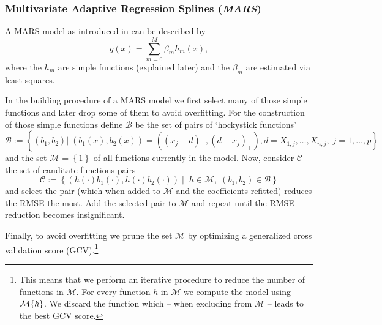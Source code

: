 \subsubsection*{Multivariate Adaptive Regression Splines (\textit{MARS})}{
    A MARS model as introduced in \cite{friedmanMultivariateAdaptiveRegression1991} can be described by 
    \begin{equation}
        \label{eq:mars}
        g(x) = \sum_{m=0}^M \beta_m h_m(x),
    \end{equation}
    where the $h_m$ are simple functions (explained later) and the $\beta_m$ are estimated via least squares. 
    
    In the building procedure of a MARS model we first select many of those simple functions and later drop some of them to avoid overfitting. For the construction of those simple functions define $\mathcal{B}$ be the set of pairs of `hockystick functions'
    \begin{equation}
        \label{eq:mars_basis_fun}
        \mathcal{B}:=\left\{
            \left(b_1,b_2\right) 
            | \;
            \left(b_1(x),b_2(x)\right) = \left(\left(x_{j}-d\right)_+,\left(d-x_{j}\right)_+\right),
            d =X_{1, j},  \ldots, X_{n, j},\;
            j=1, \ldots, p
        \right\}
    \end{equation}
    and the set $\mathcal{M}=\left\{1\right\}$ of all functions currently in the model. Now, consider $\mathcal{C}$ the set of canditate functions-pairs 
    \begin{equation}
        \label{eq:mars_candidate}
        \mathcal{C}:=\left\{
            \left(h(\cdot)b_1(\cdot),  h(\cdot)b_2(\cdot) \right)
            \;| \;\; h\in\mathcal{M}, \; 
            (b_1,b_2) \in \mathcal{B}
        \right\}
    \end{equation}
    and select the pair (which when added to $\mathcal{M}$ and the coefficients refitted) reduces the RMSE the most. Add the selected pair to $\mathcal{M}$ and repeat until the RMSE reduction becomes insignificant.

    Finally, to avoid overfitting we prune the set $\mathcal{M}$ by optimizing a generalized cross validation score (GCV).\footnote{This means that we perform an iterative procedure to reduce the number of functions in $\mathcal{M}$. For every function $h$ in $\mathcal{M}$ we compute the model using $\mathcal{M}\\\{h\}$. We discard the function which -- when excluding from $\mathcal{M}$ -- leads to the best GCV score.}  

}
